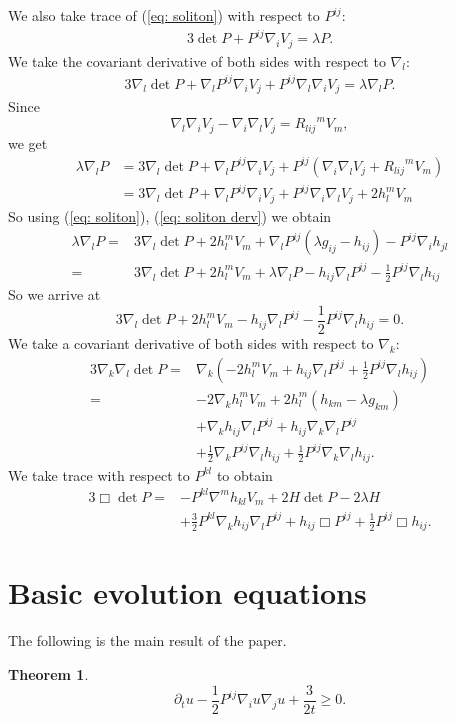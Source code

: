 \documentclass{amsart}
\newtheorem{theorem}{Theorem}
\theoremstyle{definition}
\theoremstyle{remark}
\numberwithin{equation}{section}
\begin{document}
We also take trace of (\ref{eq: soliton}) with respect to $P^{ij}$:
\begin{align*}
3\det P+P^{ij}\nabla_iV_j=\lambda P.
\end{align*}
We take the covariant derivative of both sides with respect to $\nabla_l:$
\begin{align*}
3\nabla_l\det P+\nabla_l P^{ij}\nabla_iV_j+P^{ij}\nabla_l\nabla_iV_j=\lambda \nabla_l P.
\end{align*}
Since
\[\nabla_l\nabla_iV_j-\nabla_i\nabla_lV_j={R_{lij}}^mV_m,\]
we get
\begin{align*}
\lambda \nabla_l P&=3\nabla_l\det P+\nabla_l P^{ij}\nabla_iV_j+P^{ij}(\nabla_i\nabla_lV_j+{R_{lij}}^mV_m)\\
&=3\nabla_l\det P+\nabla_l P^{ij}\nabla_iV_j+P^{ij}\nabla_i\nabla_lV_j+2h_l^mV_m
\end{align*}
So using (\ref{eq: soliton}), (\ref{eq: soliton derv}) we obtain
\begin{align*}
\lambda \nabla_l P
=&3\nabla_l\det P+2h_l^mV_m+\nabla_l P^{ij}(\lambda g_{ij}-h_{ij})-P^{ij}\nabla_ih_{jl}\\
=&3\nabla_l\det P+2h_l^mV_m+\lambda \nabla_l P-h_{ij}\nabla_l P^{ij}-\frac{1}{2}P^{ij}\nabla_lh_{ij}
\end{align*}
So we arrive at
\[3\nabla_l\det P+2h_l^mV_m-h_{ij}\nabla_l P^{ij}-\frac{1}{2}P^{ij}\nabla_lh_{ij}=0.\]
We take a covariant derivative of both sides with respect to $\nabla_k:$
\begin{align*}
3\nabla_k\nabla_l\det P=&\nabla_k(-2h_l^mV_m+h_{ij}\nabla_l P^{ij}+\frac{1}{2}P^{ij}\nabla_lh_{ij})\\
=&-2\nabla_kh_l^m V_m+2h_l^m(h_{km}-\lambda g_{km})\\
&+\nabla_kh_{ij}\nabla_l P^{ij}+h_{ij}\nabla_k\nabla_l P^{ij}\\
&+\frac{1}{2}\nabla_kP^{ij}\nabla_lh_{ij}+\frac{1}{2}P^{ij}\nabla_k\nabla_lh_{ij}.
\end{align*}
We take trace with respect to $P^{kl}$ to obtain 
\begin{align*}
3\Box\det P
=&-P^{kl}\nabla^mh_{kl} V_m+2H\det P-2\lambda H\\
&+\frac{3}{2}P^{kl}\nabla_kh_{ij}\nabla_l P^{ij}+h_{ij}\Box P^{ij}+\frac{1}{2}P^{ij}\Box h_{ij}.
\end{align*}
\section{Basic evolution equations}
The following is the main result of the paper.
\begin{theorem}
\[\partial_t u-\frac{1}{2}P^{ij}\nabla_iu\nabla_ju+\frac{3}{2t}\geq 0. \]
\end{theorem}
\end{document}
